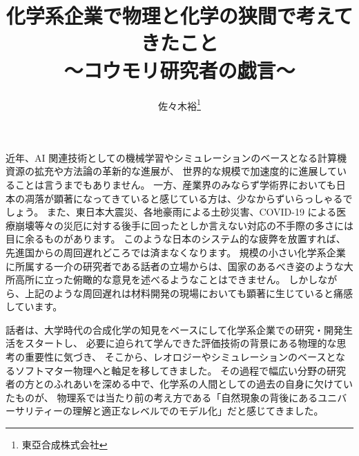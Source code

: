 \documentclass[uplatex,a4paper, 11pt]{jsarticle}
\title{化学系企業で物理と化学の狭間で考えてきたこと\\ \Large{～コウモリ研究者の戯言～}}
\author{佐々木裕\thanks{東亞合成株式会社}}
\date{}%
\begin{document}
\maketitle
\vspace{-2mm}
近年、AI 関連技術としての機械学習やシミュレーションのベースとなる計算機資源の拡充や方法論の革新的な進展が、
世界的な規模で加速度的に進展していることは言うまでもありません。
一方、産業界のみならず学術界においても日本の凋落が顕著になってきていると感じている方は、少なからずいらっしゃるでしょう。
また、東日本大震災、各地豪雨による土砂災害、COVID-19 による医療崩壊等々の災厄に対する後手に回ったとしか言えない対応の不手際の多さには目に余るものがあります。
このような日本のシステム的な疲弊を放置すれば、先進国からの周回遅れどころでは済まなくなります。
規模の小さい化学系企業に所属する一介の研究者である話者の立場からは、国家のあるべき姿のような大所高所に立った俯瞰的な意見を述べるようなことはできません。
しかしながら、上記のような周回遅れは材料開発の現場においても顕著に生じていると痛感しています。

話者は、大学時代の合成化学の知見をベースにして化学系企業での研究・開発生活をスタートし、
必要に迫られて学んできた評価技術の背景にある物理的な思考の重要性に気づき、
そこから、レオロジーやシミュレーションのベースとなるソフトマター物理へと軸足を移してきました。
その過程で幅広い分野の研究者の方とのふれあいを深める中で、化学系の人間としての過去の自身に欠けていたものが、
物理系では当たり前の考え方である「自然現象の背後にあるユニバーサリティーの理解と適正なレベルでのモデル化」だと感じてきました。
\end{document}
